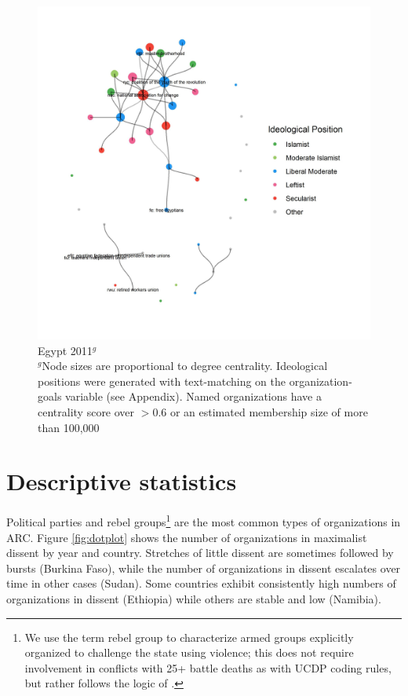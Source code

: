 \begin{figure}
    \centering
    \includegraphics[width = 1.1\columnwidth]{img/egypt_2011.jpg}
    \caption{Egypt 2011$^g$ \\
        \footnotesize{$^g$Node sizes are proportional to degree centrality. Ideological positions were generated with text-matching on the organization-goals variable (see Appendix). Named organizations have a centrality score over $>0.6$ or an estimated membership size of more than 100,000}
}
    \label{Fig: Net1}
\end{figure}


\clearpage

\section{Descriptive statistics}

Political parties and rebel groups\footnote{We use the term rebel group to
characterize armed groups explicitly organized to challenge the state using
violence; this does not require involvement in conflicts with 25+ battle deaths
as with UCDP coding rules, but rather follows the logic of \citet{Lewis2020}.}
are the most common types of organizations in ARC. Figure \ref{fig:dotplot}
shows the number of organizations in maximalist dissent by year and country.
Stretches of little dissent are sometimes followed by bursts (Burkina Faso),
while the number of organizations in dissent escalates over time in other cases
(Sudan). Some countries exhibit consistently high numbers of organizations in
dissent (Ethiopia) while others are stable and low (Namibia). 

